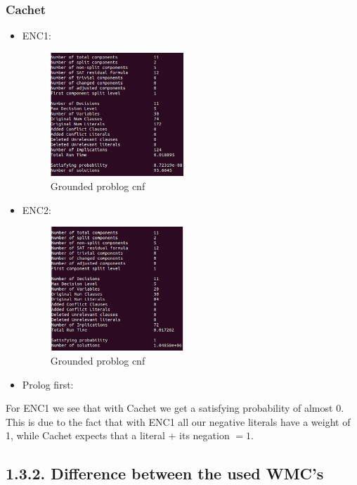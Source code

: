 \documentclass[a4paper,10pt]{report}
\begin{document}
\subsubsection*{Cachet}
\begin{itemize}
	\item ENC1: 

\begin{figure}[H]
\begin{center}
  \includegraphics[width=5cm]{cachet-ENC1.png}
  \caption{Grounded problog cnf}
\end{center}
\end{figure}

	\item ENC2:
\begin{figure}[H]
\begin{center}
  \includegraphics[width=5cm]{cachet-ENC2.png}
  \caption{Grounded problog cnf}
\end{center}
\end{figure}

	\item Prolog first:
\end{itemize}

For ENC1 we see that with Cachet we get a satisfying probability of almost $0$. This is due to the fact that with ENC1 all our negative literals have a weight of 1, while Cachet expects that a literal $+$ its negation $= 1$. 

\subsection*{1.3.2. Difference between the used WMC's}
\end{document}

